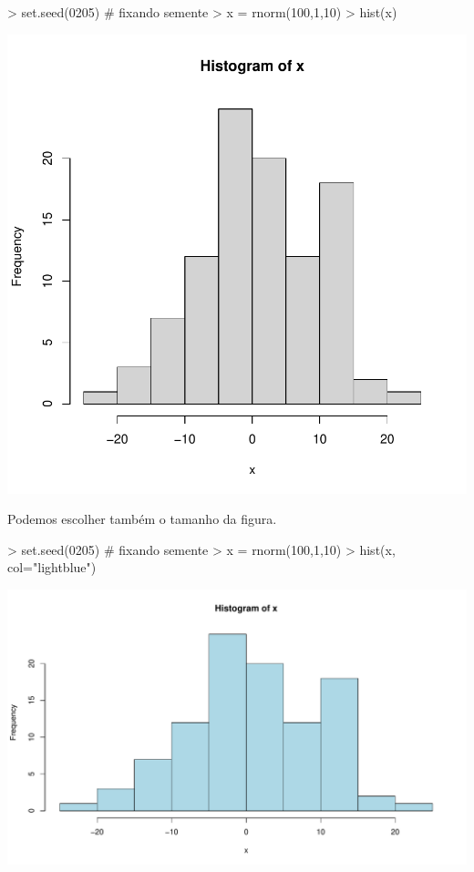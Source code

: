 \documentclass[12pt,a4paper]{article}
\begin{document}
\begin{Schunk}
\begin{Sinput}
> set.seed(0205) # fixando semente
> x = rnorm(100,1,10)
> hist(x)
\end{Sinput}
\end{Schunk}
\includegraphics{page-003}

Podemos escolher também o tamanho da figura.

\begin{Schunk}
\begin{Sinput}
> set.seed(0205) # fixando semente
> x = rnorm(100,1,10)
> hist(x, col="lightblue")
\end{Sinput}
\end{Schunk}
\includegraphics{page-004}
\end{document}
